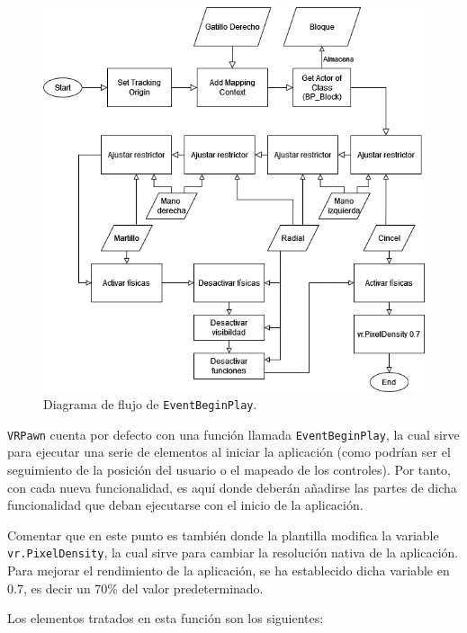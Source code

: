 \begin{figure}[H]
	\centering
	\includegraphics[width=12cm]{imagenes/flowchart2}
	\caption{Diagrama de flujo de \texttt{EventBeginPlay}.}
	\label{fig:fc2}
\end{figure}

\texttt{VRPawn} cuenta por defecto con una función llamada \texttt{EventBeginPlay}, la cual sirve para ejecutar una serie de elementos al iniciar la aplicación (como podrían ser el seguimiento de la posición del usuario o el mapeado de los controles). Por tanto, con cada nueva funcionalidad, es aquí donde deberán añadirse las partes de dicha funcionalidad que deban ejecutarse con el inicio de la aplicación.

Comentar que en este punto es también donde la plantilla modifica la variable \texttt{vr.PixelDensity}, la cual sirve para cambiar la resolución nativa de la aplicación. Para mejorar el rendimiento de la aplicación, se ha establecido dicha variable en 0.7, es decir un 70\% del valor predeterminado.

Los elementos tratados en esta función son los siguientes:

